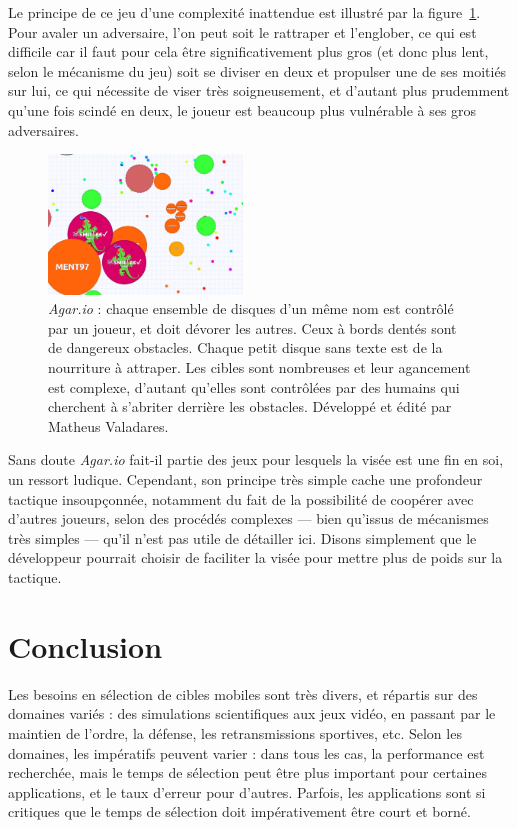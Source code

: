 	Le principe de ce jeu d'une complexité inattendue est illustré par la figure~\ref{fig:agario}. Pour avaler un adversaire, l'on peut soit le rattraper et l'englober, ce qui est difficile car il faut pour cela être significativement plus gros (et donc plus lent, selon le mécanisme du jeu) soit se diviser en deux et propulser une de ses moitiés sur lui, ce qui nécessite de viser très soigneusement, et d'autant plus prudemment qu'une fois scindé en deux, le joueur est beaucoup plus vulnérable à ses gros adversaires.
	
	\begin{figure}
		\centering
		\includegraphics[width=0.46\textwidth]{figures/ch1/agario}
		\caption[\emph{Agar.io}]{\emph{Agar.io} : chaque ensemble de disques d'un même nom est contrôlé par un joueur, et doit dévorer les autres. Ceux à bords dentés sont de dangereux obstacles. Chaque petit disque sans texte est de la nourriture à attraper. Les cibles sont nombreuses et leur agancement est complexe, d'autant qu'elles sont contrôlées par des humains qui cherchent à s'abriter derrière les obstacles. Développé et édité par Matheus Valadares.}
		\label{fig:agario}
	\end{figure}
	
	
	Sans doute \emph{Agar.io} fait-il partie des jeux pour lesquels la visée est une fin en soi, un ressort ludique. Cependant, son principe très simple cache une profondeur tactique insoupçonnée, notamment du fait de la possibilité de coopérer avec d'autres joueurs, selon des procédés complexes --- bien qu'issus de mécanismes très simples --- qu'il n'est pas utile de détailler ici. Disons simplement que le développeur pourrait choisir de faciliter la visée pour mettre plus de poids sur la tactique.

	
	\section{Conclusion}    
	Les besoins en sélection de cibles mobiles sont très divers, et répartis sur des domaines variés : des simulations scientifiques aux jeux vidéo, en passant par le maintien de l'ordre, la défense, les retransmissions sportives, etc. Selon les domaines, les impératifs peuvent varier : dans tous les cas, la performance est recherchée, mais le temps de sélection peut être plus important pour certaines applications, et le taux d'erreur pour d'autres. Parfois, les applications sont si critiques que le temps de sélection doit impérativement être court et borné.
	

